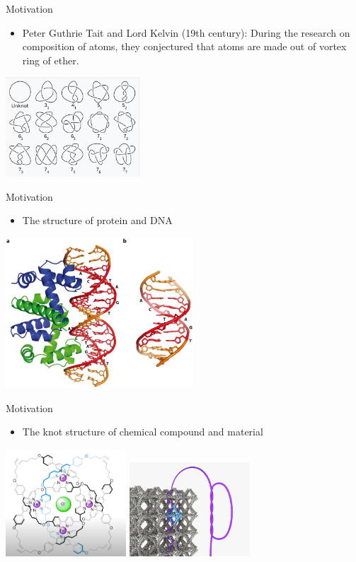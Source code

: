 \begin{frame}{Motivation}
\begin{itemize}
    \item Peter Guthrie Tait and Lord Kelvin (19th century): During the research on composition of atoms, they conjectured that atoms are made out of vortex ring of ether.
\end{itemize}
\centering
\includegraphics[width=5cm]{Pictures/simple knots.png}
\end{frame}

\begin{frame}{Motivation}
\begin{itemize}
    \item The structure of protein and DNA
\end{itemize}
\centering
\includegraphics[width=7cm]{Pictures/DNA.png}
\end{frame}

\begin{frame}{Motivation}
\begin{itemize}
    \item The knot structure of chemical compound and material
\end{itemize}
\centering
\includegraphics[width = 4.5cm]{Pictures/chemical.png}
\includegraphics[width=4.5cm]{Pictures/material.jpg}
\end{frame}

